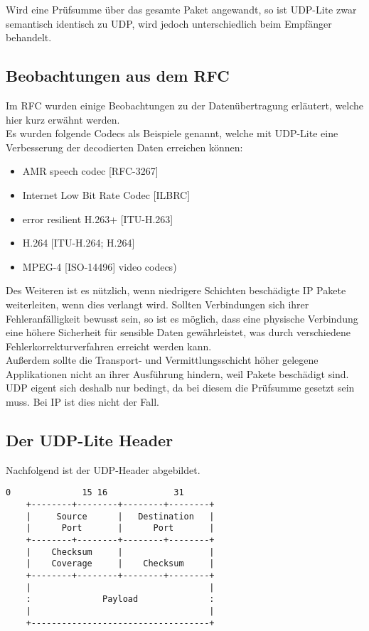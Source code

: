 \documentclass{template}
\begin{document}
Wird eine Prüfsumme über das gesamte Paket angewandt, so ist UDP-Lite zwar semantisch identisch
zu UDP, wird jedoch unterschiedlich beim Empfänger behandelt.\\

\subsection{Beobachtungen aus dem RFC}
Im RFC wurden einige Beobachtungen zu der Datenübertragung erläutert, welche hier kurz erwähnt werden.\\

Es wurden folgende Codecs als Beispiele genannt, welche mit UDP-Lite
eine Verbesserung der decodierten Daten erreichen können:
\begin{itemize}
\item AMR speech codec [RFC-3267]
\item Internet Low Bit Rate Codec [ILBRC]
\item error resilient H.263+ [ITU-H.263]
\item H.264 [ITU-H.264; H.264]
\item MPEG-4 [ISO-14496] video codecs)
\end{itemize}

Des Weiteren ist es nützlich, wenn niedrigere Schichten beschädigte IP Pakete
weiterleiten, wenn dies verlangt wird. Sollten Verbindungen sich ihrer
Fehleranfälligkeit bewusst sein, so ist es möglich, dass eine physische Verbindung
eine höhere Sicherheit für sensible Daten gewährleistet, was durch verschiedene
Fehlerkorrekturverfahren erreicht werden kann.\\

Außerdem sollte die Transport- und Vermittlungsschicht höher gelegene
Applikationen nicht an ihrer Ausführung hindern, weil Pakete beschädigt sind.
UDP eigent sich deshalb nur bedingt, da bei diesem die Prüfsumme gesetzt
sein muss. Bei IP ist dies nicht der Fall.\\

\subsection{Der UDP-Lite Header}

Nachfolgend ist der UDP-Header abgebildet.

\begin{lstlisting}[linewidth=0.47\textwidth]
     0              15 16             31
    +--------+--------+--------+--------+
    |     Source      |   Destination   |
    |      Port       |      Port       |
    +--------+--------+--------+--------+
    |    Checksum     |                 |
    |    Coverage     |    Checksum     |
    +--------+--------+--------+--------+
    |                                   |
    :              Payload              :
    |                                   |
    +-----------------------------------+
\end{lstlisting}
\cite{rfc:udplite}
\end{document}
